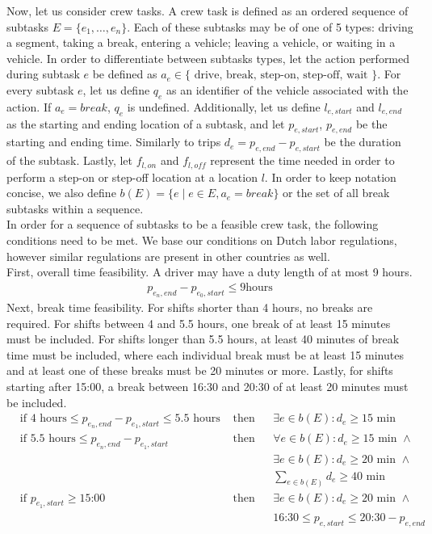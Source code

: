 \documentclass[]{article}
\begin{document}
Now, let us consider crew tasks. A crew task is defined as an ordered sequence of subtasks $E = \{ e_1, \dots, e_n \}$. Each of these subtasks may be of one of 5 types: driving a segment, taking a break, entering a vehicle; leaving a vehicle, or waiting in a vehicle. In order to differentiate between subtasks types, let the action performed during subtask $e$ be defined as $a_e \in \{\text{ drive, break, step-on, step-off, wait }\}$. For every subtask $e$, let us define $q_e$ as an identifier of the vehicle associated with the action. If $a_e = break$, $q_e$ is undefined. Additionally, let us define $l_{e,start}$ and $l_{e,end}$ as the starting and ending location of a subtask, and let $p_{e,start}$, $p_{e,end}$ be the starting and ending time. Similarly to trips $d_e = p_{e,end} - p_{e,start}$ be the duration of the subtask. Lastly, let $f_{l,on}$ and $f_{l,\textit{off}}$ represent the time needed in order to perform a step-on or step-off location at a location $l$. In order to keep notation concise, we also define $b(E) = \{ e \mid e \in E, a_e = break \}$ or the set of all break subtasks within a sequence.\\
In order for a sequence of subtasks to be a feasible crew task, the following conditions need to be met. We base our conditions on Dutch labor regulations, however similar regulations are present in other countries as well. \\ 
First, overall time feasibility. A driver may have a duty length of at most 9 hours. \\
\begin{align}
  p_{e_n,end} - p_{e_0,start} \leq 9\text{hours}
\end{align}
Next, break time feasibility. For shifts shorter than 4 hours, no breaks are required. For shifts between 4 and 5.5 hours, one break of at least 15 minutes must be included. For shifts longer than 5.5 hours, at least 40 minutes of break time must be included, where each individual break must be at least 15 minutes and at least one of these breaks must be 20 minutes or more. Lastly, for shifts starting after 15:00, a break between 16:30 and 20:30 of at least 20 minutes must be included. 
\begin{align}
  &\text{if } 4 \text{ hours} \leq p_{e_n,end} - p_{e_1,start} \leq 5.5 \text{ hours}&\text{ then} && \exists e \in b(E) : d_e \geq 15 \text{ min} \\
  &\text{if } 5.5 \text{ hours} \leq p_{e_n,end} - p_{e_1,start} &\text{ then} && \forall e \in b(E) : d_e \geq 15\text{ min } \land \\
  &&&& \exists e \in b(E) : d_e \geq 20 \text{ min } \land \\
  &&&& \sum_{e \in b(E)}d_e \geq 40 \text{ min} \\
  &\text{if } p_{e_1,start} \geq \text{15:00} &\text{ then} && \exists e \in b(E) : d_e \geq 20 \text{ min } \land \\
  &&&& \text{16:30} \leq p_{e,start} \leq \text{20:30} - p_{e,end}  \\
\end{align}
\end{document}
